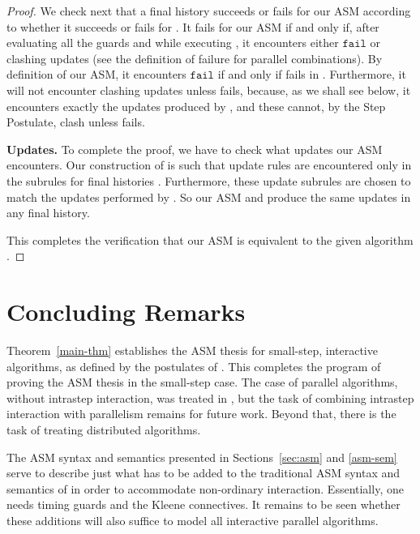 \documentclass{LMCS}
\theoremstyle{definition}
\newcommand{\ttt}[1]{\ensuremath{\mathtt {#1}}}
\begin{document}
\begin{proof}
We check next that a final history  succeeds or fails for our
ASM according to whether it succeeds or fails for . It fails
for our ASM if and only if, after evaluating all the guards and
while executing , it encounters either
\ttt{fail} or clashing updates (see the definition of failure for
parallel combinations).  By definition of our ASM, it encounters
\ttt{fail} if and only if  fails in . Furthermore, it
will not encounter clashing updates unless  fails, because, as
we shall see below, it encounters exactly the updates produced by
, and these cannot, by the Step Postulate, clash unless 
fails.

\medskip\noindent\textbf{Updates.} To complete the proof, we have to
 check what updates our ASM encounters.  Our
construction of  is such that update rules are encountered
only in the subrules  for final histories
. Furthermore, these update subrules are chosen to match the
updates performed by .  So our ASM and  produce the same
updates in any final history.

This completes the verification that our ASM is equivalent to the
given algorithm .
\end{proof}

\section{Concluding Remarks}

Theorem~\ref{main-thm} establishes the ASM thesis for small-step,
interactive algorithms, as defined by the postulates of \cite{ga1}.
This completes the program of proving the ASM thesis in the small-step
case.  The case of parallel algorithms, without intrastep interaction,
was treated in \cite{parth}, but the task of combining intrastep
interaction with parallelism remains for future work.  Beyond that,
there is the task of treating distributed algorithms.  

The ASM syntax and semantics presented in Sections~\ref{sec:asm} and
\ref{asm-sem} serve to describe just what has to be added to the
traditional ASM syntax and semantics of \cite{G103} in order to
accommodate non-ordinary interaction.  Essentially, one needs timing
guards and the Kleene connectives.  It remains to be seen whether
these additions will also suffice to model all interactive parallel
algorithms.  
\end{document}
